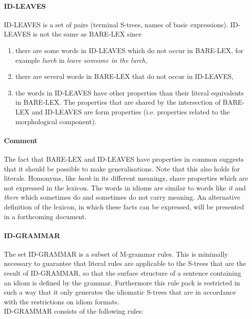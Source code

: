 \paragraph{ID-LEAVES}
ID-LEAVES is a set of pairs (terminal S-trees, names of basic expressions).
ID-LEAVES is not the same as BARE-LEX since 
\begin{enumerate}
  \item there are some words in ID-LEAVES which do not occur in BARE-LEX, for
example {\em lurch} in {\em leave someone in the lurch}, 
  \item there are several words in BARE-LEX that do not occur in ID-LEAVES,
  \item the words in ID-LEAVES have other properties than their literal 
equivalents in BARE-LEX. The properties that are shared by the intersection of 
BARE-LEX and ID-LEAVES are form properties (i.e. properties related to the
morphological component).
\end{enumerate}

\paragraph{Comment}
The fact that BARE-LEX and ID-LEAVES have properties in common suggests that it 
should be possible to make generalisations. Note that this also holds for 
literals. Homonyms, like {\em bank} in its different meanings, share properties 
which are not expressed in the lexicon. The words in idioms are similar to 
words like {\em it} and {\em there} which sometimes do and sometimes do not 
carry meaning. An alternative definition of the lexicon, in which these facts 
can be expressed, will be presented in a forthcoming document.

\paragraph{ID-GRAMMAR}
The set ID-GRAMMAR is a subset of M-grammar rules. This is minimally necessary
to guarantee that literal rules are applicable to the S-trees that are the
result of ID-GRAMMAR, so that the surface structure of a sentence containing an
idiom is defined by the grammar. Furthermore this rule pack is restricted in
such a way that it only generates the idiomatic S-trees that are in accordance
with the restrictions on idiom formats.\\ 

ID-GRAMMAR consists of the following rules:\\

